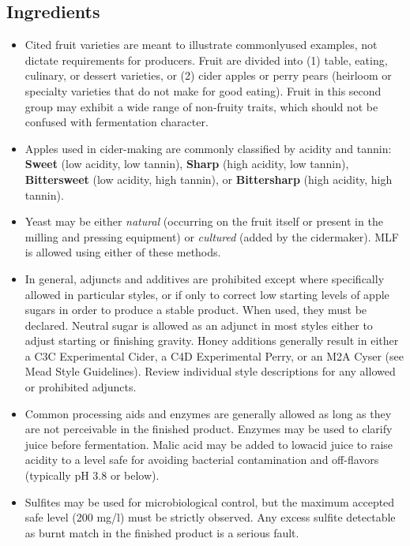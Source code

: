 \subsection*{Ingredients}

\begin{itemize}
\item Cited fruit varieties are meant to illustrate commonlyused examples, not dictate requirements for producers. Fruit are divided into (1) table, eating, culinary, or dessert varieties, or (2) cider apples or perry pears (heirloom or specialty varieties that do not make for good eating). Fruit in this second group may exhibit a wide range of non-fruity traits, which should not be confused with fermentation character.
\item Apples used in cider-making are commonly classified by acidity and tannin: \textbf{Sweet} (low acidity, low tannin), \textbf{Sharp} (high acidity, low tannin), \textbf{Bittersweet} (low acidity, high tannin), or \textbf{Bittersharp} (high acidity, high tannin).
\item Yeast may be either \textit{natural} (occurring on the fruit itself or present in the milling and pressing equipment) or \textit{cultured} (added by the cidermaker). MLF is allowed using either of these methods.
\item In general, adjuncts and additives are prohibited except where specifically allowed in particular styles, or if only to correct low starting levels of apple sugars in order to produce a stable product. When used, they must be declared. Neutral sugar is allowed as an adjunct in most styles either to adjust starting or finishing gravity. Honey additions generally result in either a C3C Experimental Cider, a C4D Experimental Perry, or an M2A Cyser (see Mead Style Guidelines). Review individual style descriptions for any allowed or prohibited adjuncts.
\item Common processing aids and enzymes are generally allowed as long as they are not perceivable in the finished product. Enzymes may be used to clarify juice before fermentation. Malic acid may be added to lowacid juice to raise acidity to a level safe for avoiding bacterial contamination and off-flavors (typically pH 3.8 or below).
\item Sulfites may be used for microbiological control, but the maximum accepted safe level (200 mg/l) must be strictly observed. Any excess sulfite detectable as burnt match in the finished product is a serious fault.

\end{itemize}
